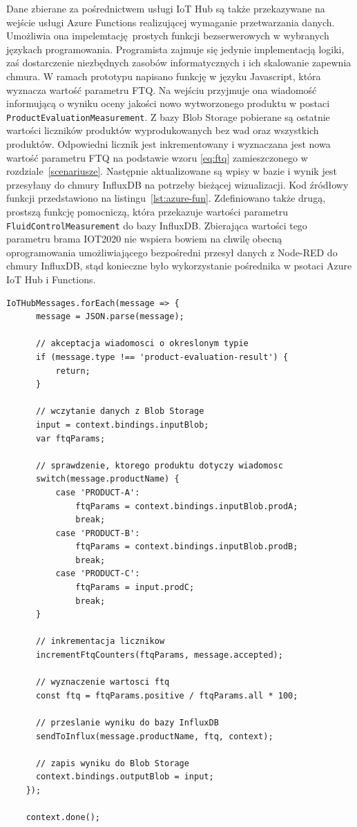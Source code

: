 \documentclass[a4paper, 12pt, twoside]{article}
\begin{document}
Dane zbierane za pośrednictwem usługi IoT Hub są także przekazywane na
wejście usługi Azure Functions realizującej wymaganie przetwarzania danych.
Umożliwia ona impelemtację prostych funkcji bezserwerowych w wybranych językach programowania.
Programista zajmuje się jedynie implementacją logiki, zaś dostarczenie niezbędnych
zasobów informatycznych i ich skalowanie zapewnia chmura.
W ramach prototypu napisano funkcję w języku Javascript, która wyznacza
wartość parametru FTQ. Na wejściu przyjmuje ona wiadomość informującą o wyniku
oceny jakości nowo wytworzonego produktu w postaci \texttt{ProductEvaluationMeasurement}.
Z bazy Blob Storage pobierane są ostatnie wartości liczników produktów wyprodukowanych
bez wad oraz wszystkich produktów. Odpowiedni licznik jest inkrementowany
i wyznaczana jest nowa wartość parametru FTQ na podstawie wzoru \ref{eq:ftq}
zamieszczonego w rozdziale~\ref{scenariusze}. Następnie aktualizowane są wpisy
w bazie i wynik jest przesyłany do chmury InfluxDB na potrzeby bieżącej wizualizacji.
Kod źródłowy funkcji przedstawiono na listingu~\ref{lst:azure-fun}. Zdefiniowano
także drugą, prostszą funkcję pomocniczą, która przekazuje wartości parametru \texttt{FluidControlMeasurement}
do bazy InfluxDB. Zbierająca wartości tego parametru brama IOT2020 
nie wspiera bowiem na chwilę obecną oprogramowania 
umożliwiającego bezpośredni przesył danych z Node-RED do chmury InfluxDB, stąd
konieczne było wykorzystanie pośrednika w psotaci Azure IoT Hub i Functions. 

\begin{lstlisting}[caption={Kod źródłowy funkcji wyznaczającej aktualną wartość 
      parametru FTQ osadzonej w usłudze Azure Functions}, label={lst:azure-fun}]
IoTHubMessages.forEach(message => {
      message = JSON.parse(message);
 
      // akceptacja wiadomosci o okreslonym typie
      if (message.type !== 'product-evaluation-result') {
          return;
      }
  
      // wczytanie danych z Blob Storage
      input = context.bindings.inputBlob;
      var ftqParams;

      // sprawdzenie, ktorego produktu dotyczy wiadomosc
      switch(message.productName) {
          case 'PRODUCT-A':
              ftqParams = context.bindings.inputBlob.prodA;
              break;
          case 'PRODUCT-B':
              ftqParams = context.bindings.inputBlob.prodB;
              break;
          case 'PRODUCT-C':
              ftqParams = input.prodC;
              break;
      }

      // inkrementacja licznikow
      incrementFtqCounters(ftqParams, message.accepted);

      // wyznaczenie wartosci ftq
      const ftq = ftqParams.positive / ftqParams.all * 100;

      // przeslanie wyniku do bazy InfluxDB
      sendToInflux(message.productName, ftq, context);

      // zapis wyniku do Blob Storage
      context.bindings.outputBlob = input;
    });

    context.done();    
\end{lstlisting}
\end{document}
